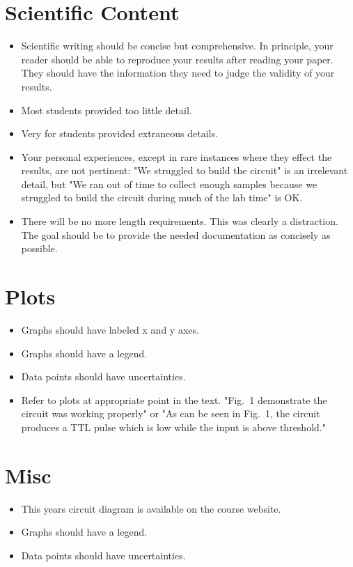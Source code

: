 \documentclass[12pt]{article}
\begin{document}
\section{Scientific Content}
\begin{itemize}
\item Scientific writing should be concise but comprehensive.  In principle, your reader should be able to reproduce your results after reading your paper.  They should have the information they need to judge the validity of your results.
\item Most students provided too little detail.
\item Very for students provided extraneous details.
\item Your personal experiences, except in rare instances where they effect the results, are not pertinent: "We struggled to build the circuit" is an irrelevant detail, but "We ran out of time to collect enough samples because we struggled to build the circuit during much of the lab time" is OK.
\item There will be no more length requirements.  This was clearly a distraction.  The goal should be to provide the needed documentation as concisely as possible.
\end{itemize}


\section{Plots}
\begin{itemize}
\item Graphs should have labeled x and y axes.
\item Graphs should have a legend.
\item Data points should have uncertainties.
\item Refer to plots at appropriate point in the text.  "Fig.~1 demonstrate the circuit was working properly" or "As can be seen in Fig.~1, the circuit produces a TTL pulse which is low while the input is above threshold."
\end{itemize}

\section{Misc}
\begin{itemize}
\item This years circuit diagram is available on the course website.  
\item Graphs should have a legend.
\item Data points should have uncertainties.
\end{itemize}
\end{document}
